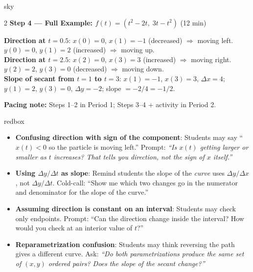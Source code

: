\documentclass[10pt]{article}
\begin{document}
\begin{skillbox}{sky}
\begin{multicols}{2}
\textbf{Step 4 --- Full Example: $f(t) = (t^2 - 2t,\; 3t - t^2)$} (12 min)

\textbf{Direction at $t = 0.5$}: $x(0) = 0$, $x(1) = -1$ (decreased)
$\Rightarrow$ moving left. $y(0) = 0$, $y(1) = 2$ (increased)
$\Rightarrow$ moving up.\\[3pt]
\textbf{Direction at $t = 2.5$}: $x(2) = 0$, $x(3) = 3$ (increased)
$\Rightarrow$ moving right. $y(2) = 2$, $y(3) = 0$ (decreased)
$\Rightarrow$ moving down.\\[3pt]
\textbf{Slope of secant from $t = 1$ to $t = 3$}:
$x(1) = -1$, $x(3) = 3$, $\Delta x = 4$;
$y(1) = 2$, $y(3) = 0$, $\Delta y = -2$;
slope $= -2/4 = -1/2$.

\end{multicols}

\smallskip
\textbf{Pacing note:} Steps 1--2 in Period 1; Steps 3--4 + activity in Period 2.
\end{skillbox}

\vspace{0.08in}

\begin{skillbox}{redbox}
\begin{itemize}[leftmargin=1.4em, itemsep=3pt]
  \item \textbf{Confusing direction with sign of the component}: Students
    may say ``$x(t) < 0$ so the particle is moving left.'' Prompt:
    \textit{``Is $x(t)$ getting larger or smaller as $t$ increases?
    That tells you direction, not the sign of $x$ itself.''}
  \item \textbf{Using $\Delta y / \Delta t$ as slope}: Remind students
    the slope of the \emph{curve} uses $\Delta y / \Delta x$, not
    $\Delta y / \Delta t$. Cold-call: ``Show me which two changes go in
    the numerator and denominator for the slope of the curve.''
  \item \textbf{Assuming direction is constant on an interval}: Students
    may check only endpoints. Prompt: ``Can the direction change inside
    the interval? How would you check at an interior value of $t$?''
  \item \textbf{Reparametrization confusion}: Students may think reversing
    the path gives a different curve. Ask: \textit{``Do both
    parametrizations produce the same set of $(x, y)$ ordered pairs?
    Does the \emph{slope} of the secant change?''}
\end{itemize}
\end{skillbox}
\end{document}
